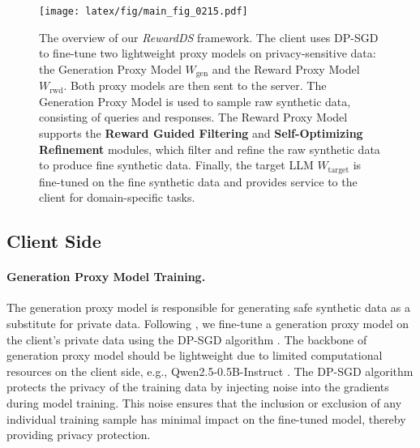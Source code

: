 
\setlength{\textfloatsep}{10pt}
\begin{figure*}[!ht]
\centering
\texttt{[image: latex/fig/main\_fig\_0215.pdf]}
\caption{
The overview of our \textit{RewardDS} framework.
The client uses DP-SGD to fine-tune two lightweight proxy models on privacy-sensitive data: the Generation Proxy Model $W_\text{gen}$ and the Reward Proxy Model $W_\text{rwd}$. 
Both proxy models are then sent to the server. 
The Generation Proxy Model is used to sample raw synthetic data, consisting of queries and responses. The Reward Proxy Model supports the \textbf{Reward Guided Filtering} and \textbf{Self-Optimizing Refinement} modules, which filter and refine the raw synthetic data to produce fine synthetic data. Finally, the target LLM $W_\text{target}$ is fine-tuned on the fine synthetic data and provides service to the client for domain-specific tasks.
}
\vspace{-0.7em}
\label{fig:algorithm}
\end{figure*}


\subsection{Client Side}
\label{sec:Method_P1}
\paragraph{Generation Proxy Model Training.}
The generation proxy model is responsible for generating safe synthetic data as a substitute for private data.
Following \cite{yue-etal-2023-synthetic, dayu2024privacy, dayu2024dp, Kurakin2023HarnessingLM}, we fine-tune a generation proxy model on the client’s private data using the DP-SGD algorithm \cite{Abadi2016DeepLDP}. 
The backbone of generation proxy model should be lightweight due to limited computational resources on the client side, e.g., Qwen2.5-0.5B-Instruct \citep{yang2024qwen2}.  
The DP-SGD algorithm protects the privacy of the training data by injecting noise into the gradients during model training. 
This noise ensures that the inclusion or exclusion of any individual training sample has minimal impact on the fine-tuned model, thereby providing privacy protection. 

